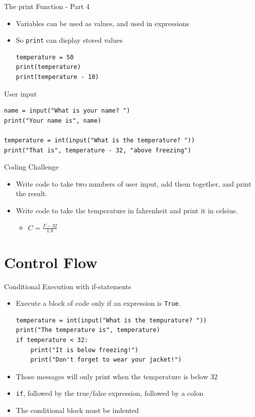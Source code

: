 \begin{frame}[fragile]{The {\ttfamily print} Function - Part 4}
  \begin{itemize}
    \item Variables can be used as values, and used in expressions
    \item So \texttt{print} can display stored values
\begin{lstlisting}
temperature = 50
print(temperature)
print(temperature - 10)
\end{lstlisting}
  \end{itemize}
\end{frame}

\begin{frame}[fragile]{User input}
\begin{lstlisting}
name = input("What is your name? ")
print("Your name is", name)

temperature = int(input("What is the temperature? "))
print("That is", temperature - 32, "above freezing")
\end{lstlisting}
\end{frame}

\begin{frame}{Coding Challenge}
  \begin{itemize}
    \item Write code to take two numbers of user input, add them together, and print the result.
    \item Write code to take the temperature in fahrenheit and print it in celsius.
      \begin{itemize}
        \item $C = \displaystyle\frac{F - 32}{1.8}$
      \end{itemize}
  \end{itemize}
\end{frame}

\section{Control Flow}

\begin{frame}[fragile]{Conditional Execution with {\ttfamily if}-statements}
  \begin{itemize}
    \item Execute a block of code only if an expression is \texttt{True}.
\begin{lstlisting}
temperature = int(input("What is the tempurature? "))
print("The temperature is", temperature)
if temperature < 32:
    print("It is below freezing!")
    print("Don't forget to wear your jacket!")
\end{lstlisting}
\item Those messages will only print when the temperature is below 32
\item \texttt{if}, followed by the true/false expression, followed by a colon
\item The conditional block must be indented
  \end{itemize}
\end{frame}

